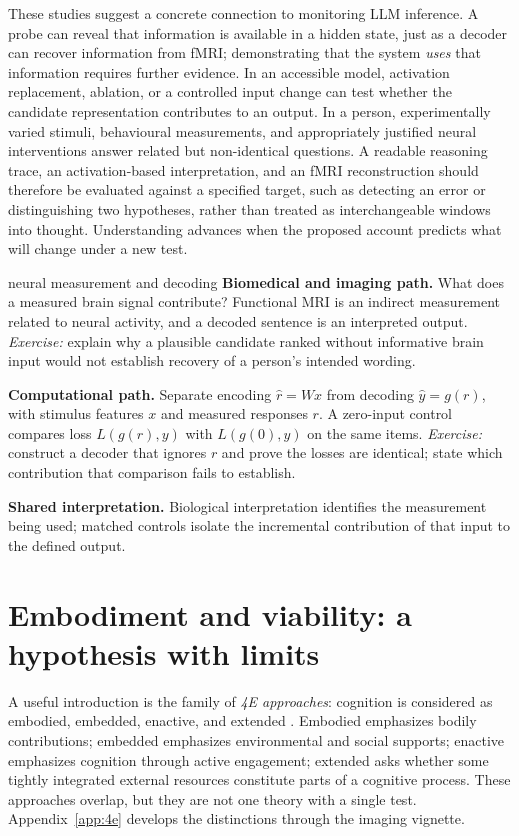 \documentclass[11pt,a4paper]{article}
\begin{document}
These studies suggest a concrete connection to monitoring LLM inference. A probe can reveal that information is available in a hidden state, just as a decoder can recover information from fMRI; demonstrating that the system \emph{uses} that information requires further evidence. In an accessible model, activation replacement, ablation, or a controlled input change can test whether the candidate representation contributes to an output. In a person, experimentally varied stimuli, behavioural measurements, and appropriately justified neural interventions answer related but non-identical questions. A readable reasoning trace, an activation-based interpretation, and an fMRI reconstruction should therefore be evaluated against a specified target, such as detecting an error or distinguishing two hypotheses, rather than treated as interchangeable windows into thought. Understanding advances when the proposed account predicts what will change under a new test.

\begin{perspectives}{neural measurement and decoding}
\textbf{Biomedical and imaging path.} What does a measured brain signal contribute? Functional MRI is an indirect measurement related to neural activity, and a decoded sentence is an interpreted output. \emph{Exercise:} explain why a plausible candidate ranked without informative brain input would not establish recovery of a person's intended wording.

\textbf{Computational path.} Separate encoding $\hat r=Wx$ from decoding $\hat y=g(r)$, with stimulus features $x$ and measured responses $r$. A zero-input control compares loss $L(g(r),y)$ with $L(g(0),y)$ on the same items. \emph{Exercise:} construct a decoder that ignores $r$ and prove the losses are identical; state which contribution that comparison fails to establish.

\textbf{Shared interpretation.} Biological interpretation identifies the measurement being used; matched controls isolate the incremental contribution of that input to the defined output.
\end{perspectives}


\section{Embodiment and viability: a hypothesis with limits}\label{sec:embodiment}
A useful introduction is the family of \emph{4E approaches}: cognition is considered as embodied, embedded, enactive, and extended \citep{newen2018}. Embodied emphasizes bodily contributions; embedded emphasizes environmental and social supports; enactive emphasizes cognition through active engagement; extended asks whether some tightly integrated external resources constitute parts of a cognitive process. These approaches overlap, but they are not one theory with a single test. Appendix~\ref{app:4e} develops the distinctions through the imaging vignette.
\end{document}
